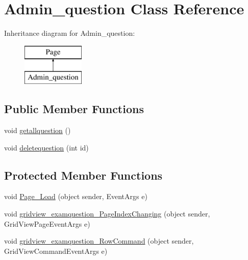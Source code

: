 \hypertarget{class_admin__question}{}\section{Admin\+\_\+question Class Reference}
\label{class_admin__question}
Inheritance diagram for Admin\+\_\+question\+:\begin{figure}[H]
\begin{center}
\leavevmode
\includegraphics[height=2.000000cm]{class_admin__question}
\end{center}
\end{figure}
\subsection*{Public Member Functions}
\begin{DoxyCompactItemize}
\item 
void \mbox{\hyperlink{class_admin__question_aa719fe8a0b6e1f38695c9ba8ebb2afc8}{getallquestion}} ()
\item 
void \mbox{\hyperlink{class_admin__question_a3a635b9197b170fdd52294d4c0f8b6f2}{deletequestion}} (int id)
\end{DoxyCompactItemize}
\subsection*{Protected Member Functions}
\begin{DoxyCompactItemize}
\item 
void \mbox{\hyperlink{class_admin__question_a8ebd33cd3e25b3c3e2bd0815f671eca9}{Page\+\_\+\+Load}} (object sender, Event\+Args e)
\item 
void \mbox{\hyperlink{class_admin__question_aacf309b4a32d49723060203cc606bbdf}{gridview\+\_\+examquestion\+\_\+\+Page\+Index\+Changing}} (object sender, Grid\+View\+Page\+Event\+Args e)
\item 
void \mbox{\hyperlink{class_admin__question_a6f7731a519d0b7ccb944e2cec3410677}{gridview\+\_\+examquestion\+\_\+\+Row\+Command}} (object sender, Grid\+View\+Command\+Event\+Args e)
\end{DoxyCompactItemize}
